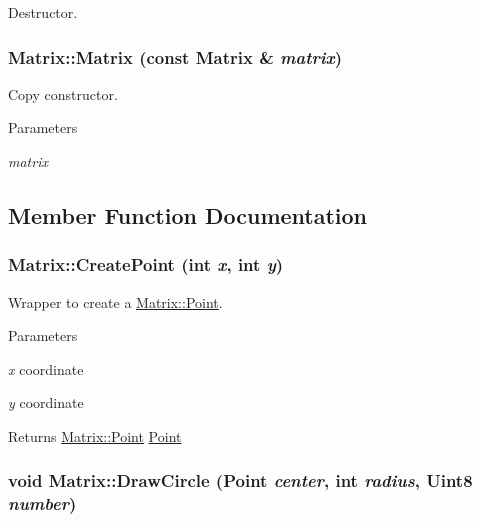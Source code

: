 Destructor. 

\hypertarget{classMatrix_a2b1fedfb1b076d4ae504d2c61019871f}{
\subsubsection[{Matrix}]{\setlength{\rightskip}{0pt plus 5cm}Matrix::Matrix (const {\bf Matrix} \& {\em matrix})}}
\label{classMatrix_a2b1fedfb1b076d4ae504d2c61019871f}


Copy constructor. 


\begin{DoxyParams}{Parameters}
\item[{\em matrix}]\end{DoxyParams}


\subsection{Member Function Documentation}
\hypertarget{classMatrix_a39929c70aea7926beaf183b374239558}{
\subsubsection[{CreatePoint}]{ Matrix::CreatePoint (int {\em x}, \/  int {\em y})}}
\label{classMatrix_a39929c70aea7926beaf183b374239558}


Wrapper to create a \hyperlink{structMatrix_1_1Point}{Matrix::Point}. 


\begin{DoxyParams}{Parameters}
\item[{\em x}]coordinate \item[{\em y}]coordinate \end{DoxyParams}
\begin{DoxyReturn}{Returns}
\hyperlink{structMatrix_1_1Point}{Matrix::Point} \hyperlink{structMatrix_1_1Point}{Point} 
\end{DoxyReturn}
\hypertarget{classMatrix_a9dd7af97fcc825ca07a64b28050cb44f}{
\subsubsection[{DrawCircle}]{\setlength{\rightskip}{0pt plus 5cm}void Matrix::DrawCircle ({\bf Point} {\em center}, \/  int {\em radius}, \/  Uint8 {\em number})}}
\label{classMatrix_a9dd7af97fcc825ca07a64b28050cb44f}


